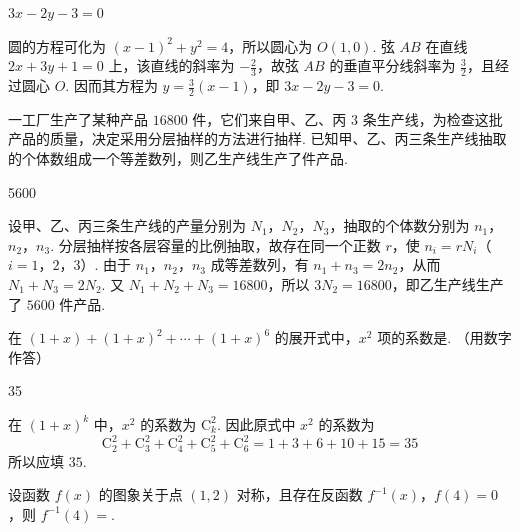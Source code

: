\begin{answer}
\(3x - 2y - 3 = 0\)
\end{answer}

\begin{solution}
圆的方程可化为 \((x-1)^2+y^2=4\)，所以圆心为 \(O(1,0)\). 弦 \(AB\) 在直线 \(2x+3y+1=0\) 上，该直线的斜率为 \(-\frac23\)，故弦 \(AB\) 的垂直平分线斜率为 \(\frac32\)，且经过圆心 \(O\). 因而其方程为 \(y=\frac32(x-1)\)，即 \(3x-2y-3=0\).
\end{solution}

\begin{problem}
一工厂生产了某种产品 \(16800\) 件，它们来自甲、乙、丙 \(3\) 条生产线，为检查这批产品的质量，决定采用分层抽样的方法进行抽样. 已知甲、乙、丙三条生产线抽取的个体数组成一个等差数列，则乙生产线生产了\fillinblank{}件产品.
\end{problem}

\begin{answer}
5600
\end{answer}

\begin{solution}
设甲、乙、丙三条生产线的产量分别为 \(N_1\)，\(N_2\)，\(N_3\)，抽取的个体数分别为 \(n_1\)，\(n_2\)，\(n_3\). 分层抽样按各层容量的比例抽取，故存在同一个正数 \(r\)，使 \(n_i=rN_i\)（\(i=1\)，\(2\)，\(3\)）. 由于 \(n_1\)，\(n_2\)，\(n_3\) 成等差数列，有 \(n_1+n_3=2n_2\)，从而 \(N_1+N_3=2N_2\). 又 \(N_1+N_2+N_3=16800\)，所以 \(3N_2=16800\)，即乙生产线生产了 \(5600\) 件产品.
\end{solution}

\begin{problem}
在 \((1 + x) + (1 + x)^2 + \cdots + (1 + x)^6\) 的展开式中，\(x^2\) 项的系数是\fillinblank{}. （用数字作答）
\end{problem}

\begin{answer}
35
\end{answer}

\begin{solution}
在 \((1+x)^k\) 中，\(x^2\) 的系数为 \(\mathrm C_k^2\). 因此原式中 \(x^2\) 的系数为
\[
\mathrm C_2^2+\mathrm C_3^2+\mathrm C_4^2+\mathrm C_5^2+\mathrm C_6^2=1+3+6+10+15=35
\]
所以应填 \(35\).
\end{solution}

\begin{problem}
设函数 \( f(x) \) 的图象关于点 \((1,2)\) 对称，且存在反函数 \( f^{-1}(x) \)，\( f(4) = 0 \)，则 \( f^{-1}(4) = \)\fillinblank{}.
\end{problem}

